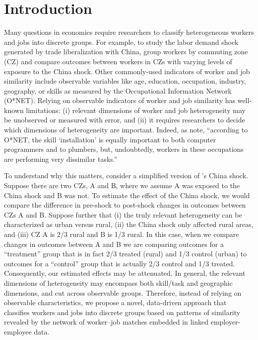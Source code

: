 \documentclass[12pt]{article}
\theoremstyle{definition}
\theoremstyle{plain}
\begin{document}


\clearpage

\onehalfspacing
\section{Introduction}

Many questions in economics require researchers to classify heterogeneous workers and jobs into discrete groups. For example, to study the labor demand shock generated by trade liberalization with China, \citet{AutorDornHanson2013} group workers by commuting zone (CZ) and compare outcomes between workers in CZs with varying levels of exposure to the China shock. Other commonly-used indicators of worker and job similarity include observable variables like age, education, occupation, industry, geography, or skills as measured by the Occupational Information Network (O*NET). Relying on observable indicators of worker and job similarity has well-known limitations: (i) relevant dimensions of worker and job heterogeneity may be unobserved or measured with error, and (ii) it requires researchers to decide which dimensions of heterogeneity are important. Indeed, as \citet{FrankAutorBessenBrynjolfssonCebrianDemingFeldmanGrohLoboMoro2019} note, ``according to O*NET, the skill `installation' is equally important to both computer programmers and to plumbers, but, undoubtedly, workers in these occupations are performing very dissimilar tasks.''  

To understand why this matters, consider a simplified version of \citet{AutorDornHanson2013}'s China shock. Suppose there are two CZs, A and B, where we assume A was exposed to the China shock and B was not. To estimate the effect of the China shock, we would compare the difference in pre-shock to post-shock changes in outcomes between CZs A and B. Suppose further that (i) the truly relevant heterogeneity can be characterized as urban versus rural, (ii) the China shock only affected rural areas, and (iii)  CZ A is 2/3 rural and B is 1/3 rural. In this case, when we compare changes in outcomes between A and B we are comparing outcomes for a ``treatment'' group that is in fact 2/3 treated (rural) and 1/3 control (urban) to outcomes for a ``control'' group that is actually 2/3 control and 1/3 treated. Consequently, our estimated effects may be attenuated. In general, the relevant dimensions of heterogeneity may encompass both skill/task and geographic dimensions, and cut across observable groups. Therefore, instead of relying on observable characteristics, we propose a novel, data-driven approach that classifies workers and jobs into discrete groups based on patterns of similarity revealed by the network of worker--job matches embedded in linked employer-employee data. 
\end{document}
